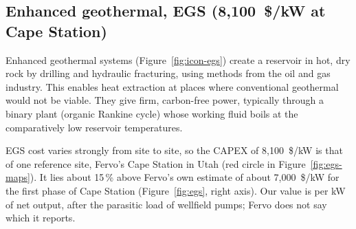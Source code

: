 \subsection{Enhanced geothermal, EGS (8,100~\$/kW at Cape Station)}\label{sec:egs}
Enhanced geothermal systems (Figure~\ref{fig:icon-egs}) create a reservoir in hot, dry rock by drilling and hydraulic fracturing, using methods from the oil and gas industry.
This enables heat extraction at places where conventional geothermal would not be viable.
They give firm, carbon-free power, typically through a binary plant (organic Rankine cycle) whose working fluid boils at the comparatively low reservoir temperatures.


EGS cost varies strongly from site to site, so the CAPEX of 8,100~\$/kW is that of one reference site, Fervo's Cape Station in Utah (red circle in Figure~\ref{fig:egs-maps}).
It lies about 15\,\% above Fervo's own estimate of about 7,000~\$/kW for the first phase of Cape Station \citep{fervos1} (Figure~\ref{fig:egs}, right axis).
Our value is per kW of net output, after the parasitic load of wellfield pumps; Fervo does not say which it reports.


